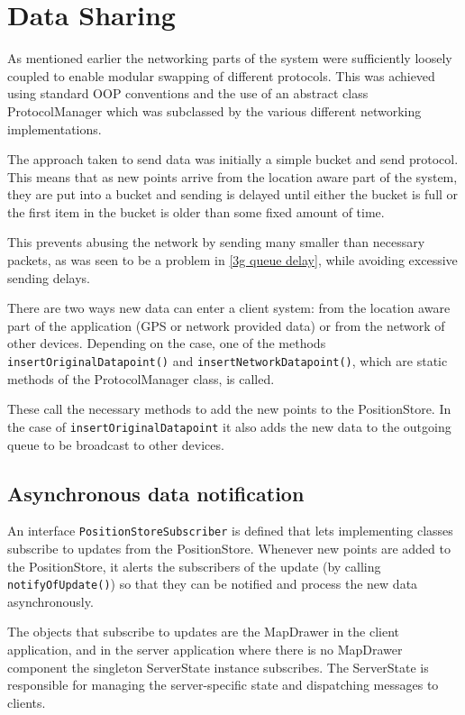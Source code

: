 \section{Data Sharing}
\label{networking}

As mentioned earlier the networking parts of the system were sufficiently loosely coupled to enable modular swapping of different protocols. This was achieved using standard OOP conventions and the use of an abstract class ProtocolManager which was subclassed by the various different networking implementations.

The approach taken to send data was initially a simple bucket and send protocol. This means that as new points arrive from the location aware part of the system, they are put into a bucket and sending is delayed until either the bucket is full or the first item in the bucket is older than some fixed amount of time.

This prevents abusing the network by sending many smaller than necessary packets, as was seen to be a problem in \ref{3g queue delay}, while avoiding excessive sending delays.

There are two ways new data can enter a client system: from the location aware part of the application (GPS or network provided data) or from the network of other devices. Depending on the case, one of the methods {\tt insertOriginalDatapoint()} and {\tt insertNetworkDatapoint()}, which are static methods of the ProtocolManager class, is called.

These call the necessary methods to add the new points to the PositionStore. In the case of {\tt insertOriginalDatapoint} it also adds the new data to the outgoing queue to be broadcast to other devices.

\subsection{Asynchronous data notification}

An interface {\tt PositionStoreSubscriber} is defined that lets implementing classes subscribe to updates from the PositionStore. Whenever new points are added to the PositionStore, it alerts the subscribers of the update (by calling {\tt notifyOfUpdate()}) so that they can be notified and process the new data asynchronously.

The objects that subscribe to updates are the MapDrawer in the client application, and in the server application where there is no MapDrawer component the singleton ServerState instance subscribes. The ServerState is responsible for managing the server-specific state and dispatching messages to clients.


